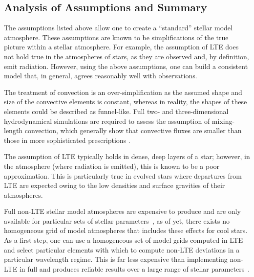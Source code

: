 
\subsection{Analysis of Assumptions and Summary} %
\label{sub:assumptions_summary}

The assumptions listed above allow one to create a ``standard'' stellar model atmosphere.
These assumptions are known to be simplifications of the true picture within a stellar atmosphere.
For example, the assumption of LTE does not hold true in the atmospheres of stars, as they are observed and, by definition, emit radiation.
However, using the above assumptions, one can build a consistent model that, in general, agrees reasonably well with observations.

The treatment of convection is an over-simplification as the assumed shape and size of the convective elements is constant, whereas in reality, the shapes of these elements could be described as funnel-like.
Full two- and three-dimensional hydrodynamical simulations are required to assess the assumption of mixing-length convection, which generally show that convective fluxes are smaller than those in more sophisticated prescriptions
\citep{2012sse..book.....K}.

The assumption of LTE typically holds in dense, deep layers of a star;
however, in the atmosphere (where radiation is emitted), this is known to be a poor approximation.
This is particularly true in evolved stars where departures from LTE are expected owing to the low densities and surface gravities of their atmospheres.

Full non-LTE stellar model atmospheres are expensive to produce and are only available for particular sets of stellar parameters~\citep[e.g. {\sc tlusty} for stars with \Teff~$>$~27\,500;][]{2003ApJS..146..417L},
as of yet, there exists no homogeneous grid of model atmospheres that includes these effects for cool stars.
As a first step, one can use a homogeneous set of model grids computed in LTE and select particular elements with which to compute non-LTE deviations in a particular wavelength regime.
This is far less expensive than implementing non-LTE in full and produces reliable results over a large range of stellar parameters~\citep[e.g][]{2007A&A...467..295N,2012MNRAS.427...27B,2015ApJ...798L..41C}.



